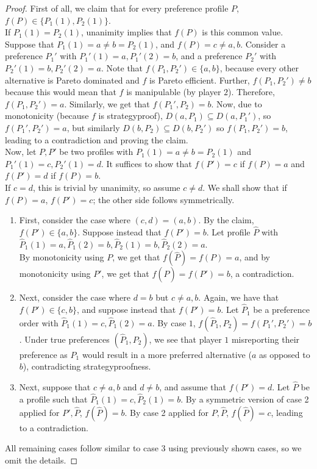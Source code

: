 	\begin{proof}
		First of all, we claim that for every preference profile $P$, $f(P) \in \{P_1(1),P_2(1)\}$.\\
		If $P_1(1) = P_2(1)$, unanimity implies that $f(P)$ is this common value.\\
		Suppose that $P_1(1) = a \ne b = P_2(1)$, and $f(P) = c \ne a,b$. Consider a preference $P_1'$ with $P_1'(1) = a, P_1'(2) = b$, and a preference $P_2'$ with $P_2'(1) = b, P_2'(2) = a$. Note that $f(P_1,P_2') \in \{a,b\}$, because every other alternative is Pareto dominated and $f$ is Pareto efficient. Further, $f(P_1,P_2') \ne b$ because this would mean that $f$ is manipulable (by player $2$). Therefore, $f(P_1,P_2') = a$.  Similarly, we get that $f(P_1',P_2) = b$. Now, due to monotonicity (because $f$ is strategyproof), $D(a,P_1) \subseteq D(a,P_1')$, so $f(P_1',P_2') = a$, but similarly $D(b,P_2) \subseteq D(b,P_2')$ so $f(P_1,P_2') = b$, leading to a contradiction and proving the claim.\\

		Now, let $P,P'$ be two profiles with $P_1(1) = a \ne b = P_2(1)$ and $P_1'(1) = c, P_2'(1) = d$. It suffices to show that $f(P') = c$ if $f(P) = a$ and $f(P') = d$ if $f(P) = b$.\\
		If $c = d$, this is trivial by unanimity, so assume $c \ne d$. We shall show that if $f(P) = a$, $f(P') = c$; the other side follows symmetrically.
		
		\begin{enumerate}
			\item First, consider the case where $(c,d) = (a,b)$. By the claim, $f(P') \in \{a,b\}$. Suppose instead that $f(P') = b$. Let profile $\hat{P}$ with $\hat{P}_1(1) = a, \hat{P}_1(2) = b, \hat{P}_2(1) = b, \hat{P}_2(2) = a$.\\
			By monotonicity using $P$, we get that $f(\hat{P}) = f(P) = a$, and by monotonicity using $P'$, we get that $f(\hat{P}) = f(P') = b$, a contradiction.

			\item Next, consider the case where $d = b$ but $c \ne a,b$. Again, we have that $f(P') \in \{c,b\}$, and suppose instead that $f(P') = b$. Let $\hat{P}_1$ be a preference order with $\hat{P}_1(1) = c, \hat{P}_1(2) = a$. By case $1$, $f(\hat{P}_1,P_2) = f(P_1',P_2') = b$. Under true preferences $(\hat{P}_1,P_2)$, we see that player $1$ misreporting their preference as $P_1$ would result in a more preferred alternative ($a$ as opposed to $b$), contradicting strategyproofness.

			\item Next, suppose that $c \ne a,b$ and $d \ne b$, and assume that $f(P') = d$. Let $\hat{P}$ be a profile such that $\hat{P}_1(1) = c, \hat{P}_2(1) = b$. By a symmetric version of case 2 applied for $P',\hat{P}$, $f(\hat{P}) = b$. By case 2 applied for $P,\hat{P}$, $f(\hat{P}) = c$, leading to a contradiction.
		\end{enumerate}
		All remaining cases follow similar to case 3 using previously shown cases, so we omit the details.
	\end{proof}

